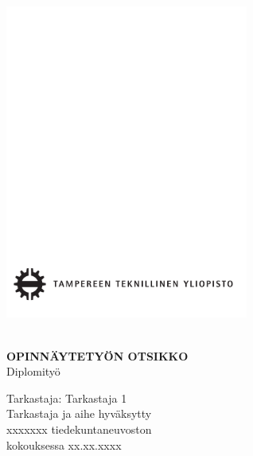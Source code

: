 \documentclass[12pt,a4paper,finnish]{vendor/tutthesis}
\begin{document}
\thispagestyle{empty}

\vspace*{-.5cm}\noindent


\includegraphics[width=8cm]{tty-logo}

\vspace{6.8cm}

\\
{\bf\large \textsf{OPINNÄYTETYÖN OTSIKKO}}\\
\textsf{Diplomityö}

\vspace{8.7cm} %

\begin{flushright}

\begin{minipage}[c]{6.8cm}
\begin{spacing}{1.0}
\textsf{Tarkastaja: Tarkastaja 1}\\
\textsf{Tarkastaja ja aihe hyväksytty}\\
\textsf{xxxxxxx tiedekuntaneuvoston}\\
\textsf{kokouksessa xx.xx.xxxx}\\
\end{spacing}
\end{minipage}
\end{flushright}

\newpage
\end{document}
